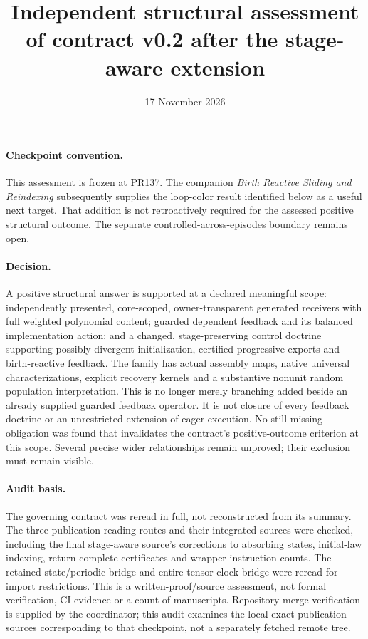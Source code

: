 \documentclass[11pt]{article}
\title{Independent structural assessment of contract v0.2 after the stage-aware extension}
\date{17 November 2026}
\begin{document}
\maketitle
\paragraph{Checkpoint convention.} This assessment is frozen at PR137. The companion \emph{Birth Reactive Sliding and Reindexing} subsequently supplies the loop-color result identified below as a useful next target. That addition is not retroactively required for the assessed positive structural outcome. The separate controlled-across-episodes boundary remains open.


\paragraph{Decision.} A positive structural answer is supported at a declared meaningful scope: independently presented, core-scoped, owner-transparent generated receivers with full weighted polynomial content; guarded dependent feedback and its balanced implementation action; and a changed, stage-preserving control doctrine supporting possibly divergent initialization, certified progressive exports and birth-reactive feedback. The family has actual assembly maps, native universal characterizations, explicit recovery kernels and a substantive nonunit random population interpretation. This is no longer merely branching added beside an already supplied guarded feedback operator. It is not closure of every feedback doctrine or an unrestricted extension of eager execution. No still-missing obligation was found that invalidates the contract's positive-outcome criterion at this scope. Several precise wider relationships remain unproved; their exclusion must remain visible.

\paragraph{Audit basis.} The governing contract was reread in full, not reconstructed from its summary. The three publication reading routes and their integrated sources were checked, including the final stage-aware source's corrections to absorbing states, initial-law indexing, return-complete certificates and wrapper instruction counts. The retained-state/periodic bridge and entire tensor-clock bridge were reread for import restrictions. This is a written-proof/source assessment, not formal verification, CI evidence or a count of manuscripts. Repository merge verification is supplied by the coordinator; this audit examines the local exact publication sources corresponding to that checkpoint, not a separately fetched remote tree.
\end{document}
